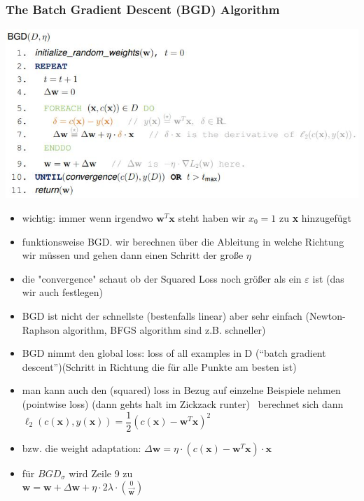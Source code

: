 \documentclass[11pt,a4paper]{article}
\begin{document}
\begin{flushleft}
\subsubsection{The Batch Gradient Descent (BGD) Algorithm}
\includegraphics[width=\textwidth]{BGD}
\begin{itemize}
\item wichtig: immer wenn irgendwo $\textbf{w}^T\textbf{x}$ steht haben wir $x_0 = 1$ zu \textbf{x} hinzugefügt
\item funktionsweise BGD. wir berechnen über die Ableitung in welche Richtung wir müssen und gehen dann einen Schritt der große $\eta$
\item die "convergence" schaut ob der Squared Loss noch größer als ein $\varepsilon$ ist (das wir auch festlegen)
\item BGD ist nicht der schnellste (bestenfalls linear) aber sehr einfach (Newton-Raphson algorithm, BFGS algorithm sind z.B. schneller)
\item BGD nimmt den global loss: loss of all examples in D (“batch gradient descent”)(Schritt in Richtung die für alle Punkte am besten ist)
\item man kann auch den (squared) loss in Bezug auf einzelne Beispiele nehmen (pointwise loss) (dann gehts halt im Zickzack runter)
\ berechnet sich dann $\ell_2(c(\textbf{x}), y(\textbf{x})) = \dfrac{1}{2} (c(\textbf{x})- \textbf{w}^T\textbf{x})^2$
\item bzw. die weight adaptation: $ \Delta\textbf{w} = \eta \cdot (c(\textbf{x}) - \textbf{w}^T \textbf{x}) \cdot \textbf{x} $
\item für $BGD_\sigma$ wird Zeile 9 zu  \\ $\textbf{w} = \textbf{w} + \Delta \textbf{w} + \eta \cdot 2 \lambda \cdot \binom{0}{\overrightarrow{\textbf{w}}}$
\end{itemize}

\end{flushleft}
\end{document}
